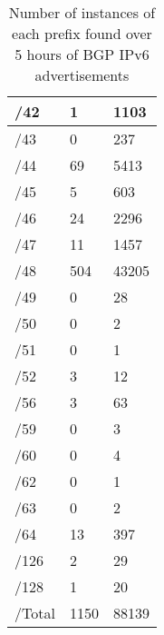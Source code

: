 \documentclass[10pt,sigconf]{acmart}
\begin{document}
\begin{table}[]
\begin{center}
\begin{tabular}{|l|l|l|}
		/42 & 1 & 1103   \\ \hline
		/43 & 0 & 237   \\ \hline
		/44 & 69 & 5413   \\ \hline
		/45 & 5 & 603   \\ \hline
		/46 & 24 & 2296  \\ \hline
		/47 & 11 & 1457   \\ \hline
		/48 & 504 & 43205   \\ \hline
		/49 & 0 & 28   \\ \hline
		/50 & 0 & 2   \\ \hline
		/51 & 0 & 1   \\ \hline
		/52 & 3 & 12   \\ \hline
		/56 & 3 & 63   \\ \hline
		/59 & 0 & 3   \\ \hline
		/60 & 0 & 4   \\ \hline
		/62 & 0 & 1   \\ \hline
		/63 & 0 & 2   \\ \hline
		/64 & 13 & 397   \\ \hline
		/126 & 2 & 29   \\ \hline
		/128 & 1 & 20   \\ \hline
		/Total & 1150 & 88139   \\ \hline
		\hline
	\end{tabular}
	\caption{Number of instances of each prefix found over 5 hours of BGP IPv6 advertisements}
\end{center}
\end{table}
\end{document}
